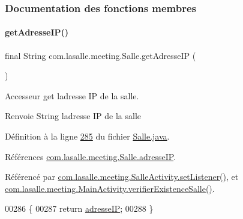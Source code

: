 \subsubsection{Documentation des fonctions membres}
\mbox{\label{classcom_1_1lasalle_1_1meeting_1_1_salle_a2189e9d589972421a0f57d045471caa8}} 
\paragraph{\texorpdfstring{get\+Adresse\+I\+P()}{getAdresseIP()}}
{\footnotesize\ttfamily final String com.\+lasalle.\+meeting.\+Salle.\+get\+Adresse\+IP (\begin{DoxyParamCaption}{ }\end{DoxyParamCaption})}



Accesseur get l\textquotesingle{}adresse IP de la salle. 

\begin{DoxyReturn}{Renvoie}
String l\textquotesingle{}adresse IP de la salle 
\end{DoxyReturn}


Définition à la ligne \hyperlink{_salle_8java_source_l00285}{285} du fichier \hyperlink{_salle_8java_source}{Salle.\+java}.



Références \hyperlink{_salle_8java_source_l00041}{com.\+lasalle.\+meeting.\+Salle.\+adresse\+IP}.



Référencé par \hyperlink{_salle_activity_8java_source_l00132}{com.\+lasalle.\+meeting.\+Salle\+Activity.\+set\+Listener()}, et \hyperlink{_main_activity_8java_source_l00261}{com.\+lasalle.\+meeting.\+Main\+Activity.\+verifier\+Existence\+Salle()}.


\begin{DoxyCode}
00286     \{
00287         \textcolor{keywordflow}{return} \hyperlink{classcom_1_1lasalle_1_1meeting_1_1_salle_ad83f4f49123c8d02f2fc0da484d3e812}{adresseIP};
00288     \}
\end{DoxyCode}
\mbox{\label{classcom_1_1lasalle_1_1meeting_1_1_salle_a8f29b7c1302251eed004d0828b7b2ab8}} 
